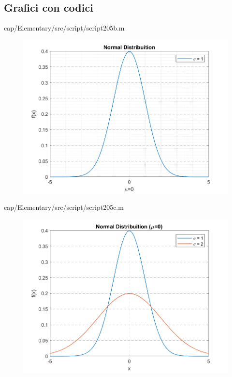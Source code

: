 \subsection{Grafici con codici}

{cap/Elementary/src/script/script205b.m}
\begin{figure}[h]
    \centering
    \includegraphics{cap/Elementary/img/script205b}
    \label{fig:script205b}
\end{figure}
\pagebreak


{cap/Elementary/src/script/script205c.m}
\begin{figure}[h]
    \centering
    \includegraphics{cap/Elementary/img/script205c}
    \label{fig:plotscript205c}
\end{figure}
\pagebreak

